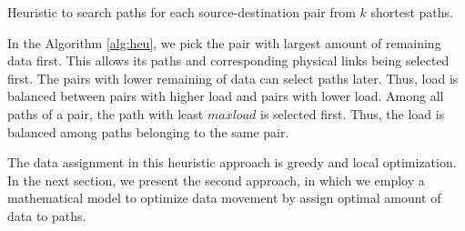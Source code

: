 \begin{algorithm}%
\SetAlgoLined\DontPrintSemicolon
{}

\caption{Heuristic to search paths for each source-destination pair from $k$ shortest paths.}
\label{alg:heu}
\end{algorithm}

In the Algorithm \ref{alg:heu}, we pick the pair with largest amount of remaining data first. This allows its paths and corresponding physical links being selected first. The pairs with lower remaining of data can select paths later.  Thus, load is balanced between pairs with higher load and pairs with lower load. Among all paths of a pair, the path with least $maxload$ is selected first. Thus, the load is balanced among paths belonging to the same pair.

The data assignment in this heuristic approach is greedy and local optimization. In the next section, we present the second approach, in which we employ a mathematical model to optimize data movement by assign optimal amount of data to paths.
